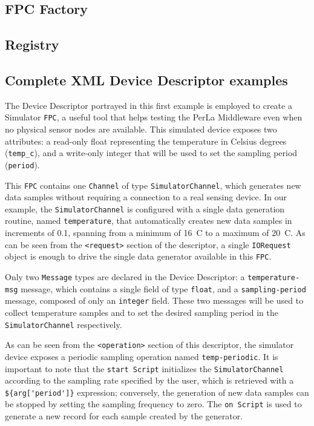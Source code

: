 \subsection{FPC Factory}

\subsection{Registry}


\subsection{Complete XML Device Descriptor examples}

The Device Descriptor portrayed in this first example is employed to create a
Simulator \texttt{FPC}, a useful tool that helps testing the PerLa Middleware
even when no physical sensor nodes are available. This simulated device exposes
two attributes: a read-only float representing the temperature in Celsius
degrees (\texttt{temp\_c}), and a write-only integer that will be used to set
the sampling period (\texttt{period}).

This \texttt{FPC} contains one \texttt{Channel} of type
\texttt{SimulatorChannel}, which generates new data samples without requiring a
connection to a real sensing device. In our example, the
\texttt{SimulatorChannel} is configured with a single data generation routine,
named \texttt{temperature}, that automatically creates new data samples in
increments of 0.1\degree, spanning from a minimum of 16\degree~C to a maximum
of 20\degree~C. As can be seen from the \lstinline!<request>! section of the
descriptor, a single \texttt{IORequest} object is enough to drive the single
data generator available in this \texttt{FPC}.

Only two \texttt{Message} types are declared in the Device Descriptor: a
\texttt{temperature-msg} message, which contains a single field of type
\texttt{float}, and a \texttt{sampling-period} message, composed of only an
\texttt{integer} field. These two messages will be used to collect temperature
samples and to set the desired sampling period in the \texttt{SimulatorChannel}
respectively.

As can be seen from the \lstinline!<operation>! section of this descriptor, the
simulator device exposes a periodic sampling operation named
\texttt{temp-periodic}. It is important to note that the \texttt{start Script}
initializes the \texttt{SimulatorChannel} according to the sampling rate
specified by the user, which is retrieved with a \lstinline!${arg['period']}!
expression; conversely, the generation of new data samples can be stopped by
setting the sampling frequency to zero. The \texttt{on Script} is used to
generate a new record for each sample created by the generator.


